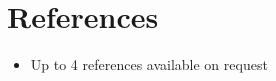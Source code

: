 \section{References}

\vspace{6pt}
 
\begin{itemize}

\item{Up to 4 references available on request}

\end{itemize}

